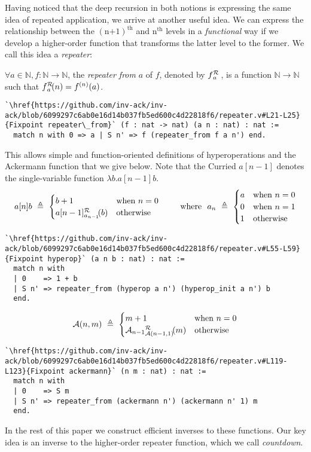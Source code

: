 Having noticed that the deep recursion in both notions is expressing the same idea
of repeated application, we arrive at another useful idea. We can express the relationship
between the $(\text{n+1})^{\text{th}}$ and $\text{n}^{\text{th}}$ levels in
a \emph{functional} way if we develop a higher-order function that transforms the latter level
to the former.  We call this idea a \emph{repeater}:
\begin{defn}
$\forall a\in \mathbb{N}, f: \mathbb{N}\to \mathbb{N}$, the \emph{repeater from} $a$ of $f$, denoted by $\rf{f}{a}$ , is a function $\mathbb{N}\to \mathbb{N}$ such that $\rf{f}{a}(n) = f^{(n)}(a)$.
\begin{lstlisting}
`\href{https://github.com/inv-ack/inv-ack/blob/6099297c6ab0e16d14b037fb5ed600c4d22818f6/repeater.v#L21-L25}{Fixpoint repeater\_from}` (f : nat -> nat) (a n : nat) : nat :=
  match n with 0 => a | S n' => f (repeater_from f a n') end.
\end{lstlisting}
\end{defn}
This allows simple and function-oriented definitions of hyperoperations and the 
Ackermann function that we give below. Note that the Curried $a[n-1]$ denotes 
the single-variable function $\lambda b.a[n-1]b$.
\vspace{-0.5em}
\begin{equation*}
\vspace{-0.75em}
a[n]b ~ \triangleq ~ \begin{cases}
b + 1 & \text{when } n = 0 \\
\rf{a[n-1]}{a_{n-1}}(b) & \text{otherwise}
\end{cases}
\qquad \text{ where } \ a_n ~ \triangleq ~ \begin{cases}
a & \text{when } n = 0 \\
0 & \text{when } n = 1 \\
1 & \text{otherwise}
\end{cases}
\end{equation*}
\begin{lstlisting}
`\href{https://github.com/inv-ack/inv-ack/blob/6099297c6ab0e16d14b037fb5ed600c4d22818f6/repeater.v#L55-L59}{Fixpoint hyperop}` (a n b : nat) : nat :=
  match n with
  | 0    => 1 + b
  | S n' => repeater_from (hyperop a n') (hyperop_init a n') b
  end.
\end{lstlisting}
\begin{equation*}
\Ack(n,m) ~ \triangleq ~ \begin{cases}
m + 1 & \text{when } n = 0 \\
\rf{\Ack_{n-1}}{\Ack(n-1,1)}(m) & \text{otherwise}
\end{cases}
\end{equation*}
\begin{lstlisting}
`\href{https://github.com/inv-ack/inv-ack/blob/6099297c6ab0e16d14b037fb5ed600c4d22818f6/repeater.v#L119-L123}{Fixpoint ackermann}` (n m : nat) : nat :=
  match n with
  | 0    => S m
  | S n' => repeater_from (ackermann n') (ackermann n' 1) m
  end.
\end{lstlisting}
In the rest of this paper we construct efficient inverses to these
functions.  Our key idea is an inverse to the higher-order repeater function, which we call \emph{countdown}.

